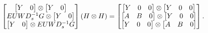 \begin{equation}
    \begin{bmatrix}
        \begin{bmatrix} Y & 0 \end{bmatrix} \otimes
            \begin{bmatrix} Y & 0 \end{bmatrix} \\
        EUWD_{s}^{-1}G \otimes \begin{bmatrix} Y & 0 \end{bmatrix} \\
        \begin{bmatrix} Y & 0 \end{bmatrix} \otimes EUWD_{s}^{-1}G \\
    \end{bmatrix}\left( H\otimes H \right) = 
    \begin{bmatrix}
        \begin{bmatrix} Y & 0 & 0 \end{bmatrix} \otimes
            \begin{bmatrix} Y & 0 & 0 \end{bmatrix} \\
        \begin{bmatrix} A & B & 0 \end{bmatrix} \otimes
            \begin{bmatrix} Y & 0 & 0 \end{bmatrix} \\
        \begin{bmatrix} Y & 0 & 0 \end{bmatrix} \otimes
            \begin{bmatrix} A & B & 0 \end{bmatrix} \\
    \end{bmatrix}.
\end{equation}

